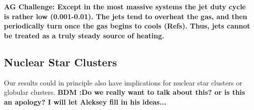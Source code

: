 \documentclass[usenatbib,fleqn]{mn2e}
\newcommand{\Mdot}{\dot{M}}
\newcommand{\eddr}{\dot{M}/\dot{M}_{\rm Edd}}
\newcommand{\vwO}{v_{w}}
\begin{document}
{\bf AG Challenge: Except in the most massive systems the jet duty
  cycle is rather low (0.001-0.01). The jets tend to overheat the gas,
  and then periodically turn once the gas begins to cools
  (Refs). Thus, jets cannot be treated as a truly steady source of
  heating. 
}



\subsection{Nuclear Star Clusters}

Our results could in principle also have implications for nuclear star clusters or globular clusters.  {\bf BDM :Do we really want to talk about this?  or is this an apology? I will let Aleksey fill in his ideas...}

  


\end{document}
